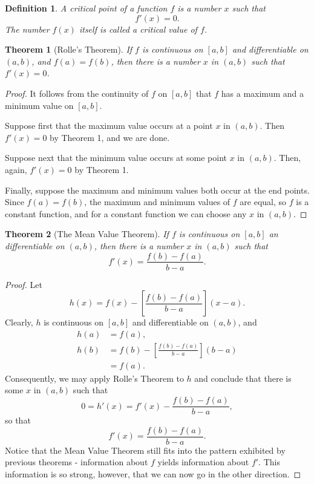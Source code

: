 \documentclass{article}
\newtheorem{definition}{Definition}
\newtheorem{theorem}{Theorem}
\begin{document}
\begin{definition}
  A \emph{critical point} of a function $f$ is a number $x$ such that \[
    f'(x) = 0.
  \] The number $f(x)$ itself is called a \emph{critical value} of $f$.
\end{definition}

\begin{theorem}[Rolle's Theorem]
  If $f$ is continuous on $[a, b]$ and differentiable on $(a, b)$, and $f(a) =
  f(b)$, then there is a number $x$ in $(a, b)$ such that $f'(x) = 0$.
\end{theorem}
\begin{proof}
  It follows from the continuity of $f$ on $[a, b]$ that $f$ has a maximum and
  a minimum value on $[a, b]$.

  Suppose first that the maximum value occurs at a point $x$ in $(a, b)$. Then
  $f'(x) = 0$ by Theorem 1, and we are done.

  Suppose next that the minimum value occurs at some point $x$ in $(a, b)$.
  Then, again, $f'(x) = 0$ by Theorem 1.

  Finally, suppose the maximum and minimum values both occur at the end points.
  Since $f(a) = f(b)$, the maximum and minimum values of $f$ are equal, so $f$
  is a constant function, and for a constant function we can choose any $x$ in
  $(a, b)$.
\end{proof}

\begin{theorem}[The Mean Value Theorem]
  If $f$ is continuous on $[a, b]$ an differentiable on $(a, b)$, then there is
  a number $x$ in $(a, b)$ such that \[
    f'(x) = \frac{f(b) - f(a)}{b - a}.
  \]
\end{theorem}
\begin{proof}
  Let \[
    h(x) = f(x) - \left[\frac{f(b) - f(a)}{b - a}\right](x - a).
  \] Clearly, $h$ is continuous on $[a, b]$ and differentiable on $(a, b)$, and
  \begin{align*}
    h(a) &= f(a), \\
    h(b) &= f(b) - \left[\frac{f(b) - f(a)}{b - a}\right](b - a) \\
         &= f(a).
  \end{align*}
  Consequently, we may apply Rolle's Theorem to $h$ and conclude that there is
  some $x$ in $(a, b)$ such that \[
    0 = h'(x) = f'(x) - \frac{f(b) - f(a)}{b - a},
  \] so that \[
    f'(x) = \frac{f(b) - f(a)}{b - a}.
  \] Notice that the Mean Value Theorem still fits into the pattern exhibited
  by previous theorems - information about $f$ yields information about $f'$.
  This information is so strong, however, that we can now go in the other
  direction.
\end{proof}
\end{document}
